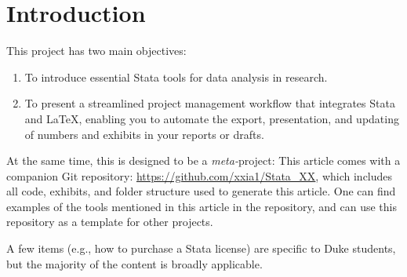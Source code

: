 
\section{Introduction} 
\label{sec_intro}
This project has two main objectives:
\begin{enumerate}
\item To introduce essential Stata tools for data analysis in research.
\item To present a streamlined project management workflow that integrates Stata and \LaTeX, enabling you to automate the export, presentation, and updating of numbers and exhibits in your reports or drafts.
\end{enumerate}

At the same time, this is designed to be a \textit{meta-}project: This article comes with a companion Git repository: \url{https://github.com/xxia1/Stata_XX}, which includes all code, exhibits, and folder structure used to generate this article. One can find examples of the tools mentioned in this article in the repository, and can use this repository as a template for other projects. 

A few items (e.g., how to purchase a Stata license) are specific to Duke students, but the majority of the content is broadly applicable.